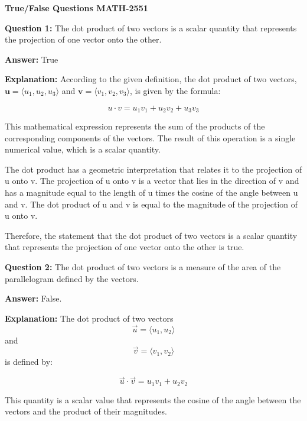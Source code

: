 \documentclass{article}
\begin{document}
\begin{center}
\textbf{\Large True/False Questions MATH-2551} \\ 
\end{center}

\vspace{1cm}






\vspace{1cm}
\textbf {Question 1:} The dot product of two vectors is a scalar quantity that represents the projection of one vector onto the other.

\textbf{Answer:} True

\textbf{Explanation:} According to the given definition, the dot product of two vectors, $\mathbf{u} = \langle u_1, u_2, u_3 \rangle$ and $\mathbf{v} = \langle v_1, v_2, v_3 \rangle$, is given by the formula:

$$u \cdot v = u_1v_1 + u_2v_2 + u_3v_3$$

This mathematical expression represents the sum of the products of the corresponding components of the vectors. The result of this operation is a single numerical value, which is a scalar quantity.

The dot product has a geometric interpretation that relates it to the projection of u onto v. The projection of u onto v is a vector that lies in the direction of v and has a magnitude equal to the length of u times the cosine of the angle between u and v. The dot product of u and v is equal to the magnitude of the projection of u onto v.

Therefore, the statement that the dot product of two vectors is a scalar quantity that represents the projection of one vector onto the other is true.

\pagebreak 

    
\textbf {Question 2:} The dot product of two vectors is a measure of the area of the parallelogram defined by the vectors.

\textbf{Answer:} False.

\textbf{Explanation:} The dot product of two vectors $$ \vec{u} = \langle u_1, u_2 \rangle $$ and $$ \vec{v} = \langle v_1, v_2 \rangle  $$ is defined by:

$$ \vec{u} \cdot \vec{v} = u_1 v_1 + u_2 v_2 $$

This quantity is a scalar value that represents the cosine of the angle between the vectors and the product of their magnitudes.
\end{document}
